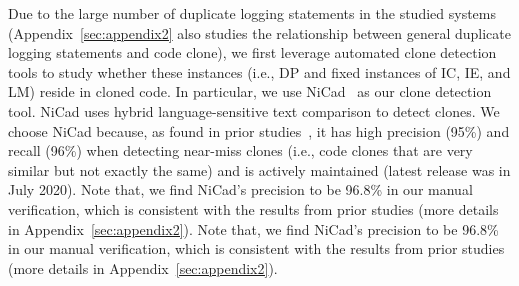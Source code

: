Due to the large number of duplicate logging statements in the studied systems (Appendix~\ref{sec:appendix2} also studies the relationship between general duplicate logging statements and code clone), we first leverage automated clone detection tools to study whether these instances (i.e., DP and fixed instances of IC, IE, and LM) reside in cloned code. In particular, we use NiCad~\cite{nicad} as our clone detection tool. NiCad uses hybrid language-sensitive text comparison to detect clones. We choose NiCad because, as found in prior studies~\cite{nicad,NicadEvaluation}, it has high precision (95\%) and recall (96\%) when detecting near-miss clones (i.e., code clones that are very similar but not exactly the same) and is actively maintained (latest release was in July 2020). Note that, we find NiCad's precision to be 96.8\% in our manual verification, which is consistent with the results from prior studies (more details in Appendix~\ref{sec:appendix2}). Note that, we find NiCad's precision to be 96.8\% in our manual verification, which is consistent with the results from prior studies (more details in Appendix~\ref{sec:appendix2}). 

